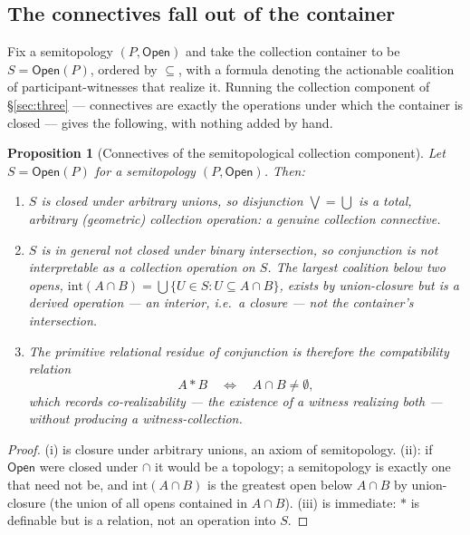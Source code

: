 \documentclass[11pt]{article}
\theoremstyle{definition}
\theoremstyle{plain}
\newtheorem{proposition}[definition]{Proposition}
\newcommand{\Coll}{S}
\begin{document}
\subsection{The connectives fall out of the container}

Fix a semitopology $(P,\mathsf{Open})$ and take the collection container to be
$\Coll = \mathsf{Open}(P)$, ordered by $\subseteq$, with a formula denoting the
actionable coalition of participant-witnesses that realize it. Running the
collection component of \S\ref{sec:three} --- connectives are exactly the
operations under which the container is closed --- gives the following, with
nothing added by hand.

\begin{proposition}[Connectives of the semitopological collection component]
\label{prop:semi-conn}
Let $\Coll = \mathsf{Open}(P)$ for a semitopology $(P,\mathsf{Open})$. Then:
\begin{enumerate}[label=\textup{(\roman*)},leftmargin=2.2em]
\item $\Coll$ is closed under arbitrary unions, so disjunction
      $\bigvee = \bigcup$ is a total, arbitrary (geometric) collection
      operation: a genuine collection connective.
\item $\Coll$ is in general \emph{not} closed under binary intersection, so
      conjunction is \emph{not} interpretable as a collection operation on
      $\Coll$. The largest coalition below two opens,
      $\mathrm{int}(A\cap B)=\bigcup\{U\in\Coll : U\subseteq A\cap B\}$, exists
      by union-closure but is a \emph{derived} operation --- an interior, i.e.\
      a closure --- not the container's intersection.
\item The primitive relational residue of conjunction is therefore the
      \emph{compatibility relation}
      \[
        A * B \quad\Longleftrightarrow\quad A\cap B \neq \emptyset,
      \]
      which records \emph{co-realizability} --- the existence of a witness
      realizing both --- without producing a witness-collection.
\end{enumerate}
\end{proposition}

\begin{proof}
(i) is closure under arbitrary unions, an axiom of semitopology. (ii): if
$\mathsf{Open}$ were closed under $\cap$ it would be a topology; a semitopology
is exactly one that need not be, and $\mathrm{int}(A\cap B)$ is the greatest
open below $A\cap B$ by union-closure (the union of all opens contained in
$A\cap B$). (iii) is immediate: $*$ is definable but is a relation, not an
operation into $\Coll$. \end{proof}
\end{document}
